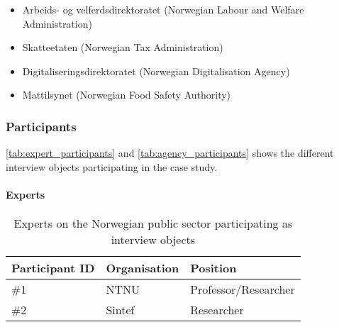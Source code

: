 \begin{itemize}
    \item Arbeids- og velferdsdirektoratet (Norwegian Labour and Welfare Administration)
    \item Skatteetaten (Norwegian Tax Administration)
    \item Digitaliseringsdirektoratet (Norwegian Digitalisation Agency)
    \item Mattilsynet (Norwegian Food Safety Authority)
\end{itemize}

\subsubsection{Participants}
\autoref{tab:expert_participants} and \autoref{tab:agency_participants} shows the different interview objects participating in the case study.

\paragraph{Experts} \hspace{0cm}
\begin{table}[H]
\centering
\begin{tabular}{|l|l|l|}
\hline
\textbf{Participant ID} & \textbf{Organisation} & \textbf{Position} \\ \hline
\#1 & NTNU & Professor/Researcher \\ \hline
\#2 & Sintef & Researcher \\ \hline
\end{tabular}
\caption{Experts on the Norwegian public sector participating as interview objects}
\label{tab:expert_participants}
\end{table}

